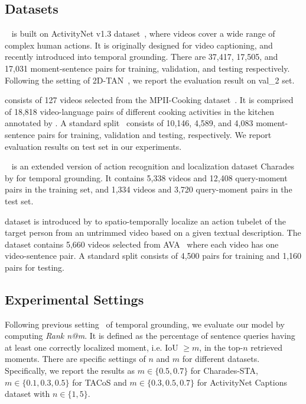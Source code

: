 \documentclass[letterpaper]{article} \usepackage{aaai22}  \usepackage{times}  \usepackage{helvet}  \usepackage{courier}  \usepackage[hyphens]{url}  \usepackage{graphicx} \urlstyle{rm} \def\UrlFont{\rm}  \usepackage{natbib}  \usepackage{caption} \DeclareCaptionStyle{ruled}{labelfont=normalfont,labelsep=colon,strut=off} \frenchspacing  \setlength{\pdfpagewidth}{8.5in}  \setlength{\pdfpageheight}{11in}  \usepackage{algorithm}
\begin{document}
\subsection{Datasets}
~\cite{DBLP:conf/iccv/KrishnaHRFN17} is built on ActivityNet v1.3 dataset~\cite{DBLP:conf/cvpr/HeilbronEGN15}, where videos cover a wide range of complex human actions. It is originally designed for video captioning, and recently introduced into temporal grounding. There are 37,417, 17,505, and 17,031 moment-sentence pairs for training, validation, and testing respectively. Following the setting of 2D-TAN~\cite{DBLP:conf/aaai/ZhangPFL20}, we report the evaluation result on val\_2 set. 

 consists of 127 videos selected from the MPII-Cooking dataset~\cite{DBLP:conf/eccv/RohrbachRAAPS12}. It is comprised of 18,818 video-language pairs of different cooking activities in the kitchen annotated by \cite{DBLP:journals/tacl/RegneriRWTSP13}. A standard split~\cite{DBLP:conf/iccv/GaoSYN17} consists of 10,146, 4,589, and 4,083 moment-sentence pairs for training, validation and testing, respectively. We report evaluation results on test set in our experiments.

~\cite{DBLP:conf/iccv/GaoSYN17} is an extended version of action recognition and localization dataset Charades~\cite{DBLP:conf/eccv/SigurdssonVWFLG16} by \cite{DBLP:conf/iccv/GaoSYN17} for temporal grounding. It contains 5,338 videos and 12,408 query-moment pairs in the training set, and 1,334 videos and 3,720 query-moment pairs in the test set.

 dataset is introduced by \cite{DBLP:journals/corr/abs-2011-05049} to spatio-temporally localize an action tubelet of the target person from an untrimmed video based on a given textual description. The dataset contains 5,660 videos selected from AVA~\cite{DBLP:conf/cvpr/GuSRVPLVTRSSM18} where each video has one video-sentence pair. A standard split consists of 4,500 pairs for training and 1,160 pairs for testing.

\subsection{Experimental Settings}
\label{sec:details}
 Following previous setting~\cite{DBLP:conf/iccv/GaoSYN17} of temporal grounding, we evaluate our model by computing {\it Rank n@m}. It is defined as the percentage of sentence queries having at least one correctly localized moment, i.e. IoU $\ge m$, in the top-$n$ retrieved moments. There are specific settings of $n$ and $m$ for different datasets. Specifically, we report the results as $m \in \{0.5, 0.7\}$ for Charades-STA, $m \in \{0.1, 0.3, 0.5\}$ for TACoS and $m \in \{0.3, 0.5, 0.7\}$ for ActivityNet Captions dataset with $n \in \{1, 5\}$. 
\end{document}
